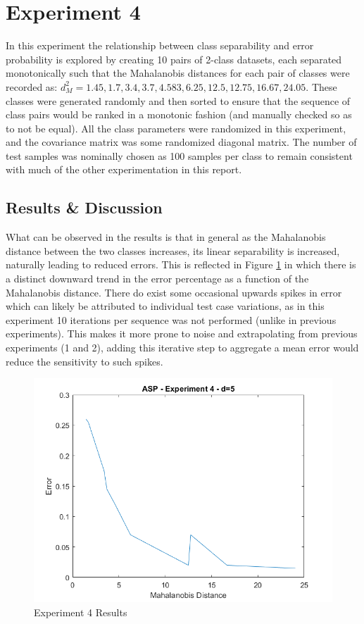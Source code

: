 \pagebreak
\section{Experiment 4}
In this experiment the relationship between class separability and error probability is explored by creating 10 pairs of 2-class datasets, each separated monotonically such that the Mahalanobis distances for each pair of classes were recorded as: $d_{M}^{2} = 1.45, 1.7, 3.4, 3.7, 4.583, 6.25, 12.5, 12.75, 16.67, 24.05$. These classes were generated randomly and then sorted to ensure that the sequence of class pairs would be ranked in a monotonic fashion (and manually checked so as to not be equal). All the class parameters were randomized in this experiment, and the covariance matrix was some randomized diagonal matrix. The number of test samples was nominally chosen as 100 samples per class to remain consistent with much of the other experimentation in this report.

\subsection{Results \& Discussion}
What can be observed in the results is that in general as the Mahalanobis distance between the two classes increases, its linear separability is increased, naturally leading to reduced errors. This is reflected in Figure \ref{fig:exp4} in which there is a distinct downward trend in the error percentage as a function of the Mahalanobis distance. There do exist some occasional upwards spikes in error which can likely be attributed to individual test case variations, as in this experiment 10 iterations per sequence was not performed (unlike in previous experiments). This makes it more prone to noise and extrapolating from previous experiments (1 and 2), adding this iterative step to aggregate a mean error would reduce the sensitivity to such spikes.

\begin{figure}[H]
	\centering
	\includegraphics[width=.9\linewidth]{./code/Exp4-results/MahalError_d5_s10.png}
	\caption{Experiment 4 Results}
	\label{fig:exp4}
\end{figure}
